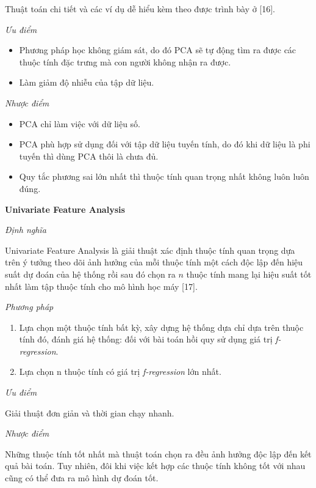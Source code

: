 \documentclass[12pt]{extarticle}
\begin{document}
				\par Thuật toán chi tiết và các ví dụ dễ hiểu kèm theo được trình bày ở [16].
				\par  \textit{Ưu điểm}
				\begin{itemize}
					\item{Phương pháp học không giám sát, do đó PCA sẽ tự động tìm ra được các thuộc tính đặc trưng mà con người không nhận ra được.}
					\item{Làm giảm độ nhiễu của tập dữ liệu.}
				\end{itemize}
				\par  \textit{Nhược điểm}
				\begin{itemize}
					\item{PCA chỉ làm việc với dữ liệu số.}
					\item{PCA phù hợp sử dụng đối với tập dữ liệu tuyến tính, do đó khi dữ liệu là phi tuyến thì dùng PCA thôi là chưa đủ.}
					\item{Quy tắc phương sai lớn nhất thì thuộc tính quan trọng nhất không luôn luôn đúng.}
				\end{itemize}
			\par \textbf{Univariate Feature Analysis}
				\par \textit{Định nghĩa} 
				\par Univariate Feature Analysis là giải thuật xác định thuộc tính quan trọng dựa trên ý tưởng theo dõi ảnh hưởng của mỗi thuộc tính một cách độc lập đến hiệu suất dự đoán của hệ thống rồi sau đó chọn ra $n$ thuộc tính mang lại hiệu suất tốt nhất làm tập thuộc tính cho mô hình học máy [17].
				\par \textit{Phương pháp}
				\begin{enumerate}
					\item Lựa chọn một thuộc tính bất kỳ, xây dựng hệ thống dựa chỉ dựa trên thuộc tính đó, đánh giá hệ thống: đối với bài toán hồi quy sử dụng giá trị \textit{f-regression}.
					\item Lựa chọn n thuộc tính có giá trị \textit{f-regression} lớn nhất.
				\end{enumerate}
				\par  \textit{Ưu điểm}
				\par Giải thuật đơn giản và thời gian chạy nhanh.
				\par  \textit{Nhược điểm}
				\par Những thuộc tính tốt nhất mà thuật toán chọn ra đều ảnh hưởng độc lập đến kết quả bài toán. Tuy nhiên, đôi khi việc kết hợp các thuộc tính không tốt với nhau cũng có thể đưa ra mô hình dự đoán tốt.
\end{document}
